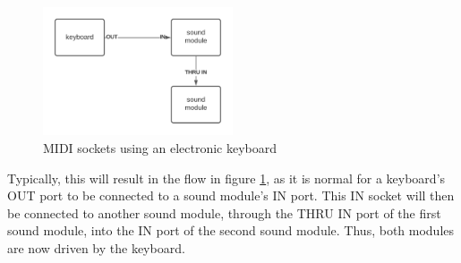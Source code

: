 \begin{figure}
	\centering
	\includegraphics[width=0.5\textwidth]{figures/midi-sockets.png}
	\caption{MIDI sockets using an electronic keyboard}
	\label{fig:midi-sockets}
\end{figure}

Typically, this will result in the flow in figure \ref{fig:midi-sockets}, as it is normal for a keyboard's OUT port to be connected to a sound module's IN port. This IN socket will then be connected to another sound module, through the THRU IN port of the first sound module, into the IN port of the second sound module. Thus, both modules are now driven by the keyboard\cite{Kirk_Hunt_2013}.

